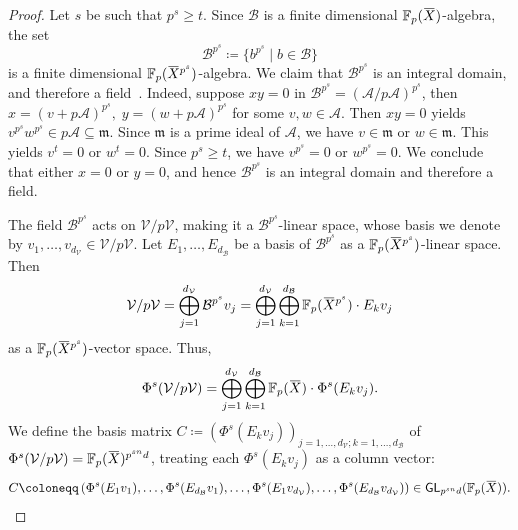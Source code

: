 \documentclass[letterpaper, 11pt, thm-restate]{article}
\numberwithin{equation}{section}
\newcommand{\F}{\mathbb{F}}
\newcommand{\GL}{\mathsf{GL}}
\newcommand{\mV}{\mathcal{V}}
\newcommand{\mA}{\mathcal{A}}
\newcommand{\mB}{\mathcal{B}}
\newcommand{\oX}{\mkern 1.5mu\overline{\mkern-1.5mu X \mkern-1.5mu}\mkern 1.5mu}
\newcommand{\frm}{\mathfrak{m}}
\theoremstyle{definition}
\theoremstyle{definition}
\theoremstyle{definition}
\begin{document}
\begin{proof}
    Let $s$ be such that $p^s \geq t$.
    Since $\mB$ is a finite dimensional $\F_p(\oX)$-algebra, the set 
    \[
    \mB^{p^s} \coloneqq \{b^{p^s} \mid b \in \mB\}
    \]
    is a finite dimensional $\F_p(\oX^{p^s})$-algebra.
    We claim that $\mB^{p^s}$ is an integral domain, and therefore a field~\cite[Corollary~4.7]{eisenbud2013commutative}.
    Indeed, suppose $xy = 0$ in $\mB^{p^s} = (\mA/p\mA)^{p^s}$, then $x = (v + p \mA)^{p^s},\; y = (w + p \mA)^{p^s}$ for some $v, w \in \mA$.
    Then $xy = 0$ yields $v^{p^s} w^{p^s} \in p \mA \subseteq \frm$.
    Since $\frm$ is a prime ideal of $\mA$, we have $v \in \frm$ or $w \in \frm$.
    This yields $v^t = 0$ or $w^t = 0$.
    Since $p^s \geq t$, we have $v^{p^s} = 0$ or $w^{p^s} = 0$.
    We conclude that either $x = 0$ or $y = 0$, and hence $\mB^{p^s}$ is an integral domain and therefore a field.

    The field $\mB^{p^s}$ acts on $\mV/p\mV$, making it a $\mB^{p^s}$-linear space, whose basis we denote by $v_1, \ldots, v_{d_{\mV}} \in \mV/p\mV$.
    Let $E_1, \ldots, E_{d_{\mB}}$ be a basis of $\mB^{p^{s}}$ as a $\F_p(\oX^{p^{s}})$-linear space.
    Then
    \[
    \mV/p\mV = \bigoplus_{j = 1}^{d_{\mV}} \mB^{p^s} v_j = \bigoplus_{j = 1}^{d_{\mV}} \bigoplus_{k = 1}^{d_{\mB}} \F_p(\oX^{p^{s}}) \cdot E_k v_j
    \]
    as a $\F_p(\oX^{p^{s}})$-vector space.
    Thus, 
    \[
    \Phi^s(\mV/p\mV) = \bigoplus_{j = 1}^{d_{\mV}} \bigoplus_{k = 1}^{d_{\mB}} \F_p(\oX) \cdot \Phi^s(E_k v_j).
    \]
    We define the basis matrix $C \coloneqq \left(\Phi^s(E_k v_j)\right)_{j = 1, \ldots, d_{\mV}; k = 1, \ldots, d_{\mB}}$ of $\Phi^s(\mV/p\mV) = \F_p(\oX)^{p^{sn}d}$, treating each $\Phi^s(E_k v_j)$ as a column vector:
    \[
    C \coloneqq \left(\Phi^s(E_1 v_1), \ldots, \Phi^s(E_{d_{\mB}} v_1), \ldots, \Phi^s(E_1 v_{d_{\mV}}), \ldots, \Phi^s(E_{d_{\mB}} v_{d_{\mV}}) \right) \in \GL_{p^{sn}d}(\F_p(\oX)).
    \]


\end{proof}
\end{document}

